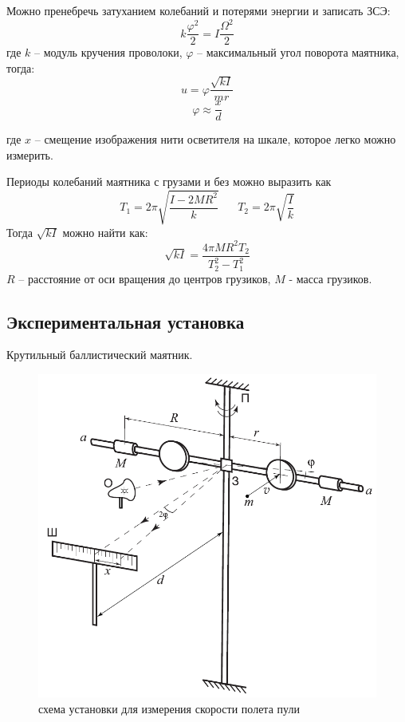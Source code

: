 \documentclass[a4paper]{article}
\begin{document}
	Можно пренебречь затуханием колебаний и потерями энергии и записать ЗСЭ:
	$$ k \frac{\varphi^2}{2} = I \frac{\Omega^2}{2} $$
	\noindent где $k$ -- модуль кручения проволоки, $\varphi$ -- максимальный угол поворота маятника, тогда:
	\begin{equation} \label{vel2}
		 u = \varphi \frac{\sqrt{kI}}{mr} 
	\end{equation}
\begin{equation}
		\label{phi}
		\varphi \approx \frac{x}{d}
	\end{equation}
	
	где $x$ -- смещение изображения нити осветителя на шкале, которое легко можно измерить.
	
	Периоды колебаний маятника с грузами и без можно выразить как
	$$T_1= 2 \pi \sqrt{\frac{I - 2MR^2}{k}} \;\;\;\;\;\; T_2 = 2 \pi \sqrt{\frac{I}{k}}$$
	Тогда $\sqrt{kI}$ можно найти как:
	\begin{equation}
		\sqrt{kI} = \frac{4 \pi M R^2 T_2}{T_2^2 - T_1^2}
		\label{kl}
	\end{equation}
	$R$ -- расстояние от оси вращения до центров грузиков, $M$ - масса грузиков.
\newpage
\subsection{Экспериментальная установка}
Крутильный баллистический маятник.
	\begin{figure}[!h]
		\begin{center}
			\includegraphics[scale = 0.8]{ustan2}
			\caption{схема установки для измерения скорости полета пули}
		\end{center}
	\end{figure}
\newpage
\end{document}
